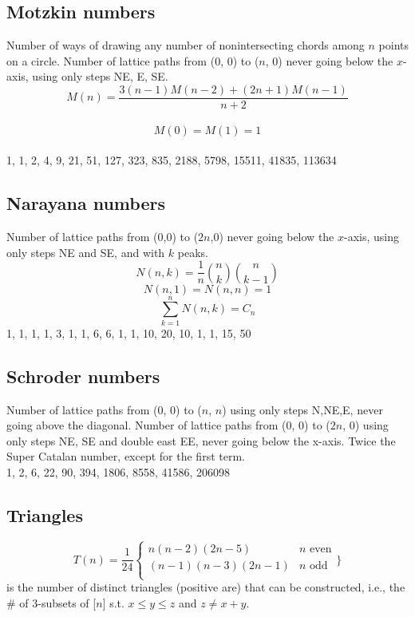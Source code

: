 \subsection{Motzkin numbers}
Number of ways of drawing any number of nonintersecting chords among $n$ points on a circle. Number of lattice paths from (0, 0) to ($n$, 0) never going below the $x$-axis, using only steps NE, E, SE.\\

$$M(n) = \frac{3(n-1)M(n-2)+(2n+1)M(n-1)}{n+2}$$\\
$$M(0) = M(1) = 1$$\\
1, 1, 2, 4, 9, 21, 51, 127, 323, 835, 2188, 5798, 15511, 41835, 113634\newline

\subsection{Narayana numbers}
Number of lattice paths from (0,0) to ($2n$,0) never going below the $x$-axis, using only steps NE and SE, and with $k$ peaks.\\
$$N(n,k) = \frac{1}{n} \binom{n}{k} \binom{n}{k-1}$$
$$N(n,1) = N(n,n) = 1$$
$$\sum_{k=1}^{n} N(n,k) = C_{n}$$
1, 1, 1, 1, 3, 1, 1, 6, 6, 1, 1, 10, 20, 10, 1, 1, 15, 50


\subsection{Schroder numbers}
Number of lattice paths from (0, 0) to ($n$, $n$) using only steps
N,NE,E, never going above the diagonal. Number of lattice
paths from (0, 0) to ($2n$, 0) using only steps NE, SE and
double east EE, never going below the x-axis. Twice the
Super Catalan number, except for the first term.\\
1, 2, 6, 22, 90, 394, 1806, 8558, 41586, 206098\\


\subsection{Triangles}

    \[T(n) = \frac{1}{24}  \left\{
    \begin{array}{ll}
        n(n - 2)(2n - 5) & \text{$n$ even}\\
        (n - 1)(n - 3)(2n - 1) & \text{$n$ odd}\\
    \end{array}
\right.\}\]
is the number of distinct triangles (positive are) that can be constructed, i.e., the \# of 3-subsets of [$n$] s.t. $x \leq y \leq z$ and $z \neq x + y$.\\


